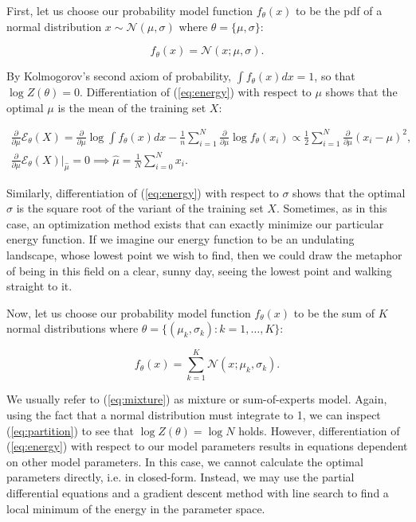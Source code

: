 \documentclass[11pt]{article}
\begin{document}
First, let us choose our probability model function $f_\theta(x)$ to be the pdf of a normal distribution $x\sim\mathcal{N}(\mu, \sigma)$ where $\theta = \{\mu,\sigma\}$:

\begin{equation}
f_\theta(x) = \mathcal{N}(x; \mu, \sigma).
\end{equation}

By Kolmogorov's second axiom of probability, $\int f_\theta(x) dx = 1$, so that $\log Z(\theta) = 0$. Differentiation of (\ref{eq:energy}) with respect to $\mu$ shows that the optimal $\mu$ is the mean of the training set $X$:

\begin{gather*}
\frac{\partial}{\partial\mu} \mathcal{E}_\theta(X) = \frac{\partial}{\partial\mu} \log \int f_\theta(x) dx - \frac{1}{n} \sum_{i=1}^N \frac{\partial}{\partial\mu} \log f_\theta(x_i)
\propto \frac{1}{2} \sum_{i=1}^N \frac{\partial}{\partial\mu} (x_i-\mu)^2,\\
\frac{\partial}{\partial\mu} \mathcal{E}_\theta(X)\big\rvert_{\hat{\mu}} = 0 \implies \hat{\mu} = \frac{1}{N} \sum_{i=0}^N x_i.
\end{gather*}

Similarly, differentiation of (\ref{eq:energy}) with respect to $\sigma$ shows that the optimal $\sigma$ is the square root of the variant of the training set $X$. Sometimes, as in this case, an optimization method exists that can exactly minimize our particular energy function. If we imagine our energy function to be an undulating landscape, whose lowest point we wish to find, then we could draw the metaphor of being in this field on a clear, sunny day, seeing the lowest point and walking straight to it.

Now, let us choose our probability model function $f_\theta(x)$ to be the sum of $K$ normal distributions where $\theta = \{(\mu_k, \sigma_k) : k=1,\ldots,K \}$:

\begin{equation}
f_\theta(x) = \sum_{k=1}^K \mathcal{N}(x; \mu_k, \sigma_k).
\label{eq:mixture}
\end{equation}

We usually refer to (\ref{eq:mixture}) as mixture or sum-of-experts model. Again, using the fact that a normal distribution must integrate to 1, we can inspect (\ref{eq:partition}) to see that $\log Z(\theta) = \log N$ holds. However, differentiation of (\ref{eq:energy}) with respect to our model parameters results in equations dependent on other model parameters. In this case, we cannot calculate the optimal parameters directly, i.e. in closed-form. Instead, we may use the partial differential equations and a gradient descent method with line search to find a local minimum of the energy in the parameter space.
\end{document}
